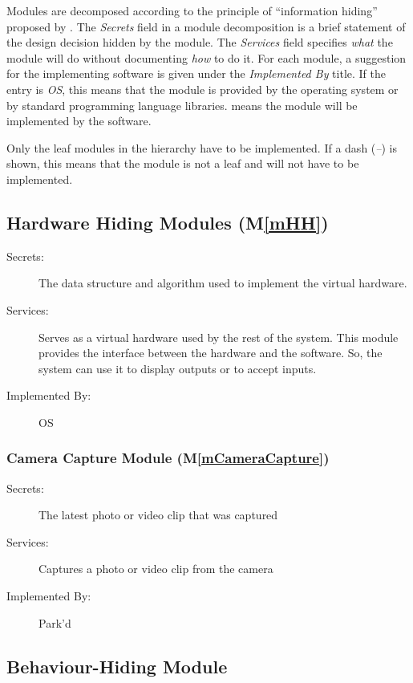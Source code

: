 \documentclass[12pt, titlepage]{article}
\newcommand{\mref}[1]{M\ref{#1}}
\begin{document}
Modules are decomposed according to the principle of ``information hiding''
proposed by \citet{ParnasEtAl1984}. The \emph{Secrets} field in a module
decomposition is a brief statement of the design decision hidden by the module.
The \emph{Services} field specifies \emph{what} the module will do without
documenting \emph{how} to do it. For each module, a suggestion for the
implementing software is given under the \emph{Implemented By} title. If the
entry is \emph{OS}, this means that the module is provided by the operating
system or by standard programming language libraries.  \emph{\progname{}} means
the module will be implemented by the \progname{} software.

Only the leaf modules in the hierarchy have to be implemented. If a dash
(\emph{--}) is shown, this means that the module is not a leaf and will not have
to be implemented.

\subsection{Hardware Hiding Modules (\mref{mHH})}

\begin{description}
\item[Secrets:]The data structure and algorithm used to implement the virtual
  hardware.
\item[Services:]Serves as a virtual hardware used by the rest of the system.
  This module provides the interface between the hardware and the software. So,
  the system can use it to display outputs or to accept inputs.
\item[Implemented By:] OS
\end{description}

\subsubsection{Camera Capture Module (\mref{mCameraCapture})}

\begin{description}
\item[Secrets:] The latest photo or video clip that was captured
\item[Services:] Captures a photo or video clip from the camera
\item[Implemented By:] Park'd
\end{description}

\subsection{Behaviour-Hiding Module}
\end{document}
